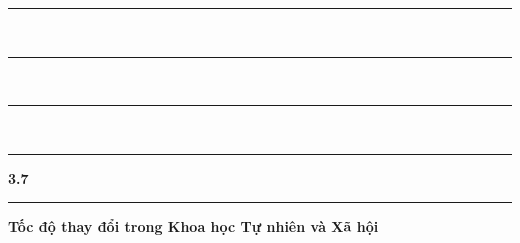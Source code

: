 \noindent
\begin{minipage}[c]{0.26\textwidth}
    \color{stewartcyan}
    \rule{\linewidth}{1.2pt}\\[3.5pt]
    \rule{\linewidth}{1.2pt}\\[3.5pt]
    \rule{\linewidth}{1.2pt}\\[3.5pt]
    \rule{\linewidth}{1.2pt}
\end{minipage}%
\hspace{8pt}%
\begin{minipage}[c]{0.70\textwidth}
    \noindent\textsf{\textbf{\fontsize{24}{26}\selectfont\color{stewartcyan}3.7}}%
    \hspace{6pt}%
    {\color{stewartcyan}\rule[-4pt]{1.5pt}{24pt}}%
    \hspace{8pt}%
    \textsf{\textbf{\fontsize{13.5}{16}\selectfont Tốc độ thay đổi trong Khoa học Tự nhiên và Xã hội}}
\end{minipage}

\vspace{10pt}


